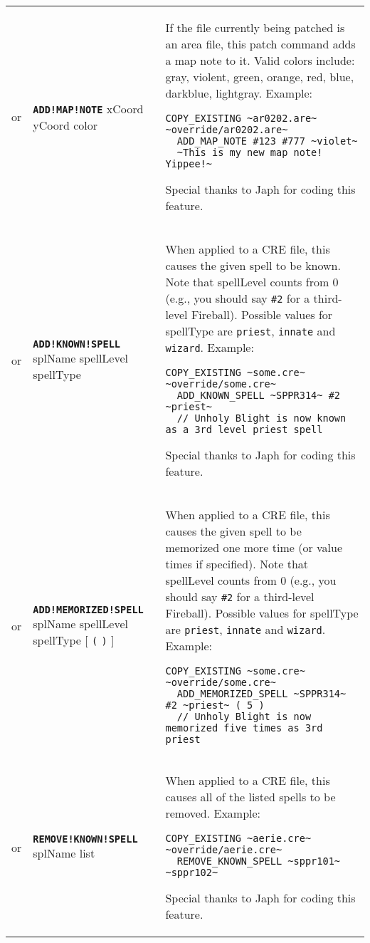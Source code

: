 \documentclass{article}
\def\ttref#1{\ahrefloc{#1}{\tt #1}}
\def\DEFINE#1{{\tt \bf #1}\label{#1}\index{#1}}
\def\t#1{{\tt #1}}
\def\Slist{{\color{red} list }}
\def\Ob{{\color{red} [ }}
\def\Oe{{\color{red} ] }}
\begin{document}
\begin{tabular}{cp{10in}|p{10in}}
  or & \DEFINE{ADD!MAP!NOTE} xCoord yCoord color \ttref{String} &
    If the file currently being patched is an \ttref{ARE} area file, this
    patch command adds a map note to it. Valid colors include: gray,
    violent, green, orange, red, blue, darkblue, lightgray.
    Example:
\begin{verbatim}
COPY_EXISTING ~ar0202.are~ ~override/ar0202.are~
  ADD_MAP_NOTE #123 #777 ~violet~
  ~This is my new map note!  Yippee!~
\end{verbatim}
    Special thanks to Japh for coding this feature.  \\

or & \DEFINE{ADD!KNOWN!SPELL} splName spellLevel spellType &
  When applied to a CRE file, this \ttref{patch} causes the given spell to
  be known. Note that spellLevel counts from 0 (e.g., you should say
  \t{\#2} for a third-level Fireball). Possible values for spellType are
  \t{priest}, \t{innate} and \t{wizard}. Example:
\begin{verbatim}
COPY_EXISTING ~some.cre~ ~override/some.cre~
  ADD_KNOWN_SPELL ~SPPR314~ #2 ~priest~
  // Unholy Blight is now known as a 3rd level priest spell
\end{verbatim}
  Special thanks to Japh for coding this feature.  \\

or & \DEFINE{ADD!MEMORIZED!SPELL} splName spellLevel spellType
  \Ob \t{(} \ttref{value} \t{)} \Oe&
  When applied to a CRE file, this \ttref{patch} causes the given spell to
  be memorized one more time (or value times if specified).
  Note that spellLevel counts from 0 (e.g., you
  should say \t{\#2} for a third-level Fireball). Possible values for spellType
  are \t{priest}, \t{innate} and \t{wizard}. Example:
\begin{verbatim}
COPY_EXISTING ~some.cre~ ~override/some.cre~
  ADD_MEMORIZED_SPELL ~SPPR314~ #2 ~priest~ ( 5 )
  // Unholy Blight is now memorized five times as 3rd priest
\end{verbatim} \\

or & \DEFINE{REMOVE!KNOWN!SPELL} splName \Slist &
  When applied to a CRE file, this \ttref{patch} causes all of the
  listed spells to be removed. Example:
\begin{verbatim}
COPY_EXISTING ~aerie.cre~ ~override/aerie.cre~
  REMOVE_KNOWN_SPELL ~sppr101~ ~sppr102~
\end{verbatim}
  Special thanks to Japh for coding this feature.  \\


\end{tabular}
\end{document}
